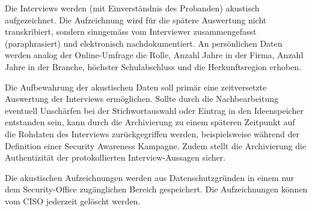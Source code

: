 \documentclass[../../main.tex]{subfiles}
\begin{document}
\begin{sloppypar}
Die Interviews werden (mit Einverständnis des Probanden) akustisch aufgezeichnet. Die Aufzeichnung wird für die spätere Auswertung nicht transkribiert, sondern sinngemäss vom Interviewer zusammengefasst (paraphrasiert) und elektronisch nachdokumentiert. An persönlichen Daten werden analog der Online-Umfrage die Rolle, Anzahl Jahre in der Firma, Anzahl Jahre in der Branche, höchster Schulabschluss und die Herkunftsregion erhoben.

Die Aufbewahrung der akustischen Daten soll primär eine zeitversetzte Auswertung der Interviews ermöglichen. Sollte durch die Nachbearbeitung eventuell Unschärfen bei der Stichwortauswahl oder Eintrag in den Ideenspeicher entstanden sein, kann durch die Archivierung zu einem späteren Zeitpunkt auf die Rohdaten des Interviews zurückgegriffen werden, beispielsweise während der Definition einer Security Awareness Kampagne. Zudem stellt die Archivierung die Authentizität der protokollierten Interview-Aussagen sicher.

Die akustischen Aufzeichnungen werden aus Datenschutzgründen in einem nur dem Security-Office zugänglichen Bereich gespeichert. Die Aufzeichnungen können vom CISO jederzeit gelöscht werden.
\end{sloppypar}
\end{document}
